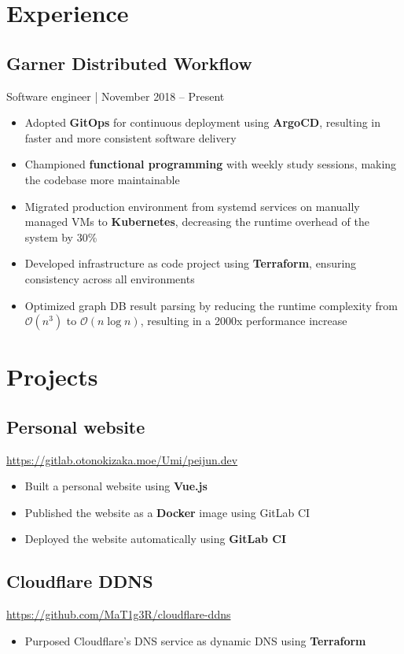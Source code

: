 \documentclass[letterpaper,12pt,oneside]{article}
\newcommand{\smallurl}[1]{\footnotesize{\url{#1}}\normalsize}
\begin{document}
\section*{Experience}
\subsection*{Garner Distributed Workflow}
Software engineer | November 2018 -- Present
\begin{itemize}
      \setlength\itemsep{0em}
      \item Adopted \textbf{GitOps} for continuous deployment using \textbf{ArgoCD}, resulting in faster and more consistent software delivery
      \item Championed \textbf{functional programming} with weekly study sessions, making the codebase more maintainable
      \item Migrated production environment from systemd services on manually managed VMs to \textbf{Kubernetes}, decreasing the runtime overhead of the system by 30\%
      \item Developed infrastructure as code project using \textbf{Terraform}, ensuring consistency across all environments
      \item Optimized graph DB result parsing by reducing the runtime complexity from $\mathcal{O}(n^3)$ to $\mathcal{O}(n\log{}n)$, resulting in a 2000x performance increase
\end{itemize}

\section*{Projects}

\subsection*{Personal website \hfill {}}
\smallurl{https://gitlab.otonokizaka.moe/Umi/peijun.dev}
\begin{itemize}
      \setlength\itemsep{0em}
      \item Built a personal website using \textbf{Vue.js}
      \item Published the website as a \textbf{Docker} image using GitLab CI
      \item Deployed the website automatically using \textbf{GitLab CI}
\end{itemize}

\subsection*{Cloudflare DDNS \hfill {}}
\smallurl{https://github.com/MaT1g3R/cloudflare-ddns}
\begin{itemize}
      \setlength\itemsep{0em}
      \item Purposed Cloudflare's DNS service as dynamic DNS using \textbf{Terraform}
\end{itemize}
\end{document}
